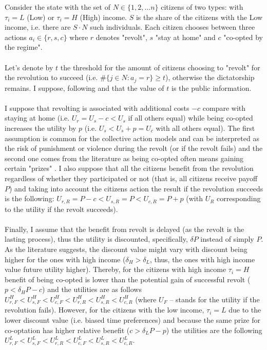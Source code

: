 \documentclass[a4paper, 12pt]{article}
\begin{document}
    Consider the state with the set of $N \in \{1, 2, \dots n\}$ citizens of two types: with $\tau_i = L$ (Low) or $\tau_i = H$ (High) income. $S$ is the share of the citizens with the Low income, i.e. there are $S \cdot N$ such individuals. Each citizen chooses between three actions $a_i \in \{r,s,c\}$ where $r$ denotes "revolt", $s$ "stay at home" and $c$ "co-opted by the regime".
    \\\\
    \noindent Let's denote by $t$ the threshold for the amount of citizens choosing to "revolt" for the revolution to succeed (i.e. $\# \{j \in N: a_j = r\} \geq t$), otherwise the dictatorship remains. I suppose, following \cite{enterpreneurs} and \cite{overthrowing} that the value of $t$ is the public information.
    \\\\
    \noindent I suppose that revolting is associated with additional costs $-c$ compare with staying at home (i.e. $U_{r} = U_s-c < U_{s}$ if all others equal) while being co-opted increases the utility by $p$ (i.e. $U_{s} < U_s+p = U_{c}$ with all others equal). The first assumption is common for the collective action models and can be interpreted as the risk of punishment or violence during the revolt (or if the revolt fails) and the second one comes from the literature as being co-opted often means gaining certain "prizes" \parencite{voting_for_autocracy}. I also suppose that all the citizens benefit from the revolution regardless of whether they participated or not (that is, all citizens receive payoff $P$) and taking into account the citizens action the result if the revolution succeeds is the following: $U_{r,R} = P - c<U_{s,R} = P < U_{c,R} = P +p$ (with $U_R$ corresponding to the utility if the revolt succeeds).
    \\\\
    Finally, I assume that the benefit from revolt is delayed (as the revolt is the lasting process), thus the utility is discounted, specifically, $\delta P$ instead of simply $P$. As the literature suggests, the discount value might vary with discount being higher for the ones with high income ($\delta_H > \delta_L$, thus, the ones with high income value future utility higher). Thereby, for the citizens with high income $\tau_i = H$ benefit of being co-opted is lower than the potential gain of successful revolt ($p < \delta_H P - c$) and the utilities are as follows $U^H_{r,F}<U^H_{s,F}<U^{H}_{c,F}<U^H_{r,R}<U^H_{s,R}<U^H_{c,R}$ (where $U_F$ -- stands for the utility if the revolution fails). However, for the citizens with the low income, $\tau_i=L$ due to the lower discount value (i.e. biased time preferences) and because the same prize for co-optation has higher relative benefit ($c > \delta_L P - p$) the utilities are the following $U^L_{r,F}<U^L_{s,F}<U^L_{r,R}<U^{L}_{c,F}<U^L_{s,R}<U^L_{c,R}$.
\end{document}
